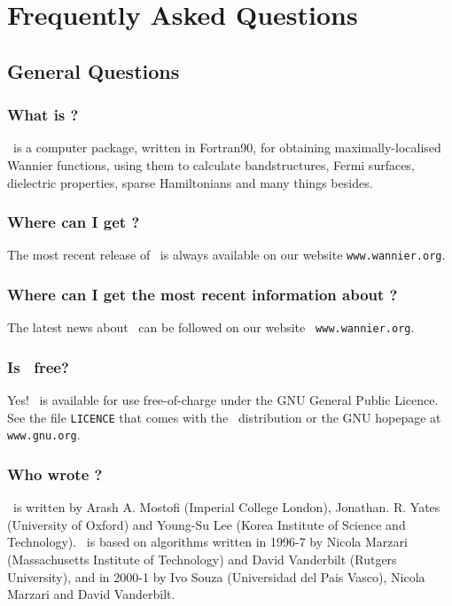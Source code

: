 \chapter{Frequently Asked Questions}\label{chap:faq}


\section{General Questions}

\subsection{What is \wannier?}

\wannier\ is a computer package, written in Fortran90, for obtaining
maximally-localised Wannier functions, using them to calculate
bandstructures, Fermi surfaces, dielectric properties, sparse
Hamiltonians and many things besides.

\subsection{Where can I get \wannier?}

The most recent release of \wannier\ is always available on our
website {\tt www.wannier.org}.

\subsection{Where can I get the most recent information about
  \wannier?}

The latest news about \wannier\ can be followed on our website {\tt
  www.wannier.org}.

\subsection{Is \wannier\ free?}

Yes! \wannier\ is available for use free-of-charge under the GNU
General Public Licence. See the file {\tt LICENCE} that comes with the
\wannier\ distribution or the GNU hopepage at {\tt www.gnu.org}. 

\subsection{Who wrote \wannier?}

\wannier\ is written by Arash A. Mostofi (Imperial College London),
Jonathan. R. Yates (University of Oxford) and Young-Su Lee (Korea
Institute of Science and Technology). \wannier\ is based on algorithms
written in 1996-7 by Nicola Marzari (Massachusetts Institute of
Technology) and David Vanderbilt (Rutgers University), and in 2000-1
by Ivo Souza (Universidad del Pais Vasco), Nicola Marzari
and David Vanderbilt.

